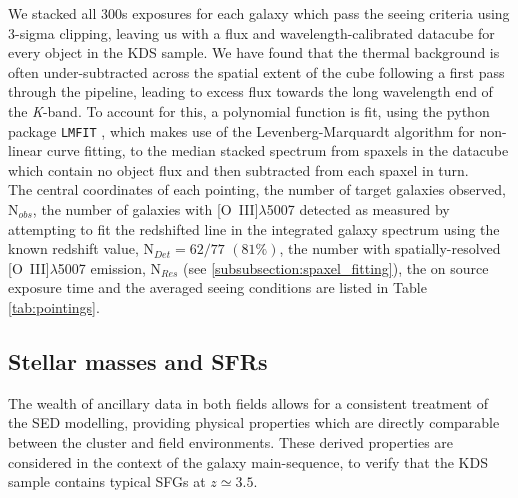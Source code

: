 \documentclass[fleqn,usenatbib]{mnras}
\begin{document}
\noindent
We stacked all 300s exposures for each galaxy which pass the seeing criteria using 3-sigma clipping, leaving us with a flux and wavelength-calibrated datacube for every object in the KDS sample.
We have found that the thermal background is often under-subtracted across the spatial extent of the cube following a first pass through the pipeline, leading to excess flux towards the long wavelength end of the {\it K}-band.
To account for this, a polynomial function is fit, using the python package {\tt LMFIT} \citep{Newville2014}, which makes use of the Levenberg-Marquardt algorithm for non-linear curve fitting, to the median stacked spectrum from spaxels in the datacube which contain no object flux and then subtracted from each spaxel in turn. \\

\noindent
The central coordinates of each pointing, the number of target galaxies observed, N$_{obs}$, the number of galaxies with [O~{\sc III}]$\lambda$5007 detected as measured by attempting to fit the redshifted line in the integrated galaxy spectrum using the known redshift value, N$_{Det} = 62/77$ $(81\%)$, the number with spatially-resolved [O~{\sc III}]$\lambda$5007 emission, N$_{Res}$ (see \cref{subsubsection:spaxel_fitting}), the on source exposure time and the averaged seeing conditions are listed in Table \ref{tab:pointings}.

\subsection{Stellar masses and SFRs}\label{subsec:stellar_masses_and_sfrs}

The wealth of ancillary data in both fields allows for a consistent treatment of the SED modelling, providing physical properties which are directly comparable between the cluster and field environments.
These derived properties are considered in the context of the galaxy main-sequence, to verify that the KDS sample contains typical SFGs at $z\simeq3.5$.
\end{document}
